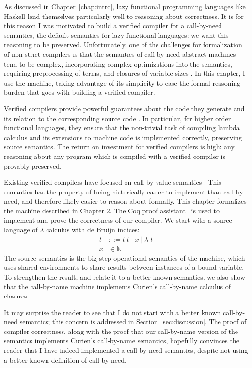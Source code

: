 \label{sec:introduction}
As discussed in Chapter~\ref{chap:intro}, lazy functional programming languages
like Haskell lend themselves particularly well to reasoning about correctness.
It is for this reason I was motivated to build a verified compiler for a
call-by-need semantics, the default semantics for lazy functional languages: we
want this reasoning to be preserved.  Unfortunately, one of the challenges for
formalization of non-strict compilers is that the semantics of call-by-need
abstract machines tend to be complex, incorporating complex optimizations into
the semantics, requiring preprocessing of terms, and closures of variable sizes
\cite{jonesstg, TIM}.  In this chapter, I use the \ce machine, taking advantage
of its simplicity to ease the formal reasoning burden that goes with building a
verified compiler.

Verified compilers provide powerful guarantees about the code they generate and
its relation to the corresponding source code \cite{chlipala2007certified,
leroy2012compcert, cakeml14}.  In particular, for higher order functional
languages, they ensure that the non-trivial task of compiling lambda
calculus and its extensions to machine code is implemented correctly,
preserving source semantics. The return on investment for verified compilers is
high: any reasoning about any program which is compiled with a verified compiler
is provably preserved. 

Existing verified compilers have focused on call-by-value semantics
\cite{chlipala2007certified, leroy2012compcert, cakeml14}. This semantics has
the property of being historically easier to implement than call-by-need, and
therefore likely easier to reason about formally. This chapter formalizes the
\ce machine described in Chapter 2. The Coq proof assistant~\cite{barras1997coq}
is used to implement and prove the correctness of our compiler. We start with a
source language of $\lambda$ calculus with de Bruijn indices: 
\begin{align*}
 t &::= t \; t \; | \; x \; | \;  \lambda \; t \\
 x &\in \mathbb{N}
\end{align*}
The source semantics is the big-step operational semantics of the \ce 
machine, which uses shared environments to share results between instances of a
bound variable. To strengthen the result, and relate it to a better-known
semantics, we also show that the call-by-name \ce machine implements Curien's
call-by-name calculus of closures. 

It may surprise the reader to see that I do not start with a better known
call-by-need semantics; this concern is addressed in
Section~\ref{sec:discussion}. The proof of compiler correctness, along with the
proof that our call-by-name version of the semantics implements Curien's
call-by-name semantics, hopefully convinces the reader that I have indeed
implemented a call-by-need semantics, despite not using a better known
definition of call-by-need. 

